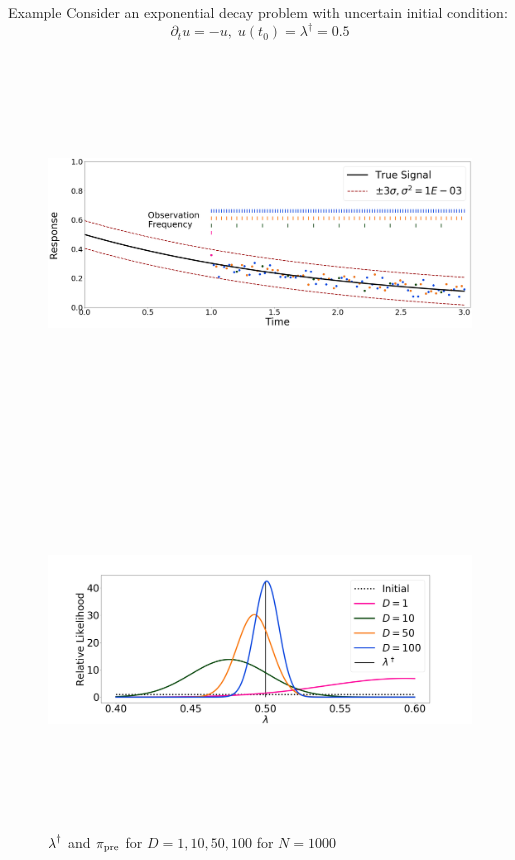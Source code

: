 \begin{block}{Example}
\centering
    Consider an exponential decay problem with uncertain initial condition:
    \begin{equation*}
        \partial_t u = - u, \; u(t_0) = \lambda^\dagger = 0.5
    \end{equation*}

    \begin{figure}
        \includegraphics[height=10cm]{exponential_decay_response_sigma-10E-4}
    \end{figure}



\centering
{}
\vspace{-1cm}
    \begin{figure}
        \includegraphics[height=10cm]{updated_convergence_sigma-10E-4}
        \caption*{$\operatorname*{\lambda}^\dagger$ and $\operatorname*{\pi_{pre}}$ for $D=1, 10, 50, 100$ for $N=1000$}
    \end{figure}


\end{block}
